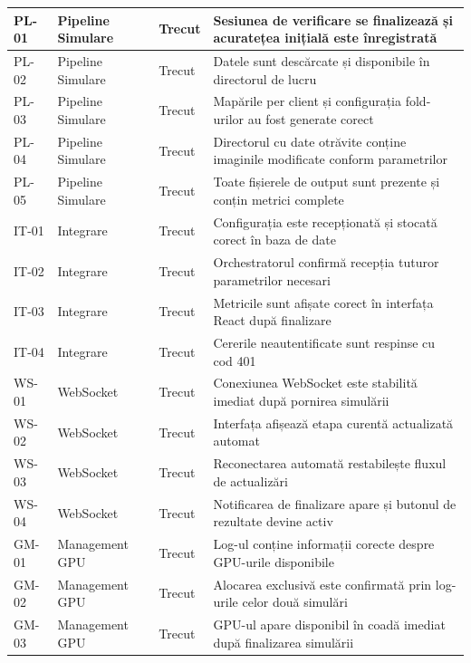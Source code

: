 \documentclass[../../main.tex]{subfiles}
\begin{document}
\begin{longtable}{|p{}|p{}|p{}|p{}|}
            \hline
            PL-01 & Pipeline Simulare & Trecut & Sesiunea de verificare se finalizează și acuratețea inițială este înregistrată \\
            \hline
            PL-02 & Pipeline Simulare & Trecut & Datele sunt descărcate și disponibile în directorul de lucru \\
            \hline
            PL-03 & Pipeline Simulare & Trecut & Mapările per client și configurația fold-urilor au fost generate corect \\
            \hline
            PL-04 & Pipeline Simulare & Trecut & Directorul cu date otrăvite conține imaginile modificate conform parametrilor \\
            \hline
            PL-05 & Pipeline Simulare & Trecut & Toate fișierele de output sunt prezente și conțin metrici complete \\
            \hline
            IT-01 & Integrare & Trecut & Configurația este recepționată și stocată corect în baza de date \\
            \hline
            IT-02 & Integrare & Trecut & Orchestratorul confirmă recepția tuturor parametrilor necesari \\
            \hline
            IT-03 & Integrare & Trecut & Metricile sunt afișate corect în interfața React după finalizare \\
            \hline
            IT-04 & Integrare & Trecut & Cererile neautentificate sunt respinse cu cod 401 \\
            \hline
            WS-01 & WebSocket & Trecut & Conexiunea WebSocket este stabilită imediat după pornirea simulării \\
            \hline
            WS-02 & WebSocket & Trecut & Interfața afișează etapa curentă actualizată automat \\
            \hline
            WS-03 & WebSocket & Trecut & Reconectarea automată restabilește fluxul de actualizări \\
            \hline
            WS-04 & WebSocket & Trecut & Notificarea de finalizare apare și butonul de rezultate devine activ \\
            \hline
            GM-01 & Management GPU & Trecut & Log-ul conține informații corecte despre GPU-urile disponibile \\
            \hline
            GM-02 & Management GPU & Trecut & Alocarea exclusivă este confirmată prin log-urile celor două simulări \\
            \hline
            GM-03 & Management GPU & Trecut & GPU-ul apare disponibil în coadă imediat după finalizarea simulării \\

\end{longtable}
\end{document}
